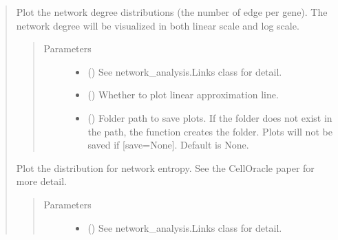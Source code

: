 \documentclass[letterpaper,10pt,english]{sphinxmanual}
\begin{document}
\begin{quote}
\begin{fulllineitems}
\begin{fulllineitems}
\label{\detokenize{modules/celloracle.network_analysis:celloracle.network_analysis.Links.plot_degree_distributions}}
Plot the network degree distributions (the number of edge per gene).
The network degree will be visualized in both linear scale and log scale.
\begin{quote}\begin{description}
\item[{Parameters}] \leavevmode\begin{itemize}
\item {} 
 ({\hyperref[\detokenize{modules/celloracle:celloracle.Links}]{}}) \textendash{} See network\_analysis.Links class for detail.

\item {} 
 () \textendash{} Whether to plot linear approximation line.

\item {} 
 () \textendash{} Folder path to save plots. If the folder does not exist in the path, the function creates the folder.
Plots will not be saved if {[}save=None{]}. Default is None.

\end{itemize}

\end{description}\end{quote}

\end{fulllineitems}


\begin{fulllineitems}
\label{\detokenize{modules/celloracle.network_analysis:celloracle.network_analysis.Links.plot_network_entropy_distributions}}
Plot the distribution for network entropy.
See the CellOracle paper for more detail.
\begin{quote}\begin{description}
\item[{Parameters}] \leavevmode\begin{itemize}
\item {} 
 () \textendash{} See network\_analysis.Links class for detail.


\end{itemize}
\end{description}
\end{quote}
\end{fulllineitems}
\end{fulllineitems}
\end{quote}
\end{document}

